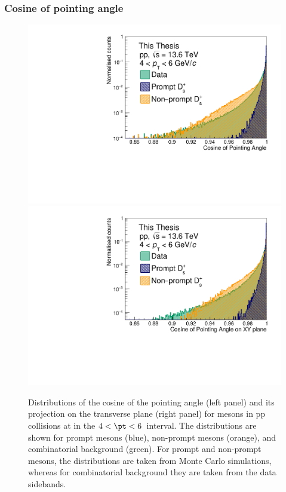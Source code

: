 \subsubsection{Cosine of pointing angle}
\begin{figure}[tb]
    \centering
    \includegraphics[width=0.48\linewidth]{Figures/Chapter 4/Cpa.pdf}
    \includegraphics[width=0.48\linewidth]{Figures/Chapter 4/CpaXY.pdf}
    \caption{Distributions of the cosine of the pointing angle (left panel) and its
    projection on the transverse plane (right panel) for \ds mesons in pp collisions at \thirteen in the $4 < \pt < 6$~\gevc interval. The distributions are shown for prompt \ds mesons (blue), non-prompt \ds mesons (orange), and combinatorial background (green). For prompt and non-prompt \ds mesons, the distributions are taken from Monte Carlo simulations, whereas for combinatorial background they are taken from the data sidebands.}
    \label{fig:PointingAngle}
\end{figure}

